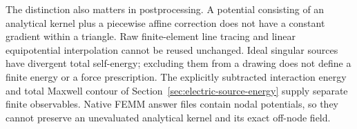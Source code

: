 The distinction also matters in postprocessing. A potential consisting of an
analytical kernel plus a piecewise affine correction does not have a constant
gradient within a triangle. Raw finite-element line tracing and linear
equipotential interpolation cannot be reused unchanged. Ideal singular
sources have divergent total self-energy; excluding them from a drawing
does not define a finite energy or a force prescription. The explicitly
subtracted interaction energy and total Maxwell contour of
Section~\ref{sec:electric-source-energy} supply separate finite observables. Native FEMM answer
files contain nodal potentials, so they cannot preserve an unevaluated
analytical kernel and its exact off-node field.
